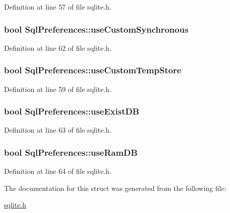 \-Definition at line 57 of file sqlite.\-h.

\hypertarget{structSqlPreferences_a3d18d11573e0546e8fe854b7584adab7}{
\subsubsection[{use\-Custom\-Synchronous}]{\setlength{\rightskip}{0pt plus 5cm}bool {\bf \-Sql\-Preferences\-::use\-Custom\-Synchronous}}}\label{structSqlPreferences_a3d18d11573e0546e8fe854b7584adab7}


\-Definition at line 62 of file sqlite.\-h.

\hypertarget{structSqlPreferences_abcd9f162cf432b71159c7c83adb8ac88}{
\subsubsection[{use\-Custom\-Temp\-Store}]{\setlength{\rightskip}{0pt plus 5cm}bool {\bf \-Sql\-Preferences\-::use\-Custom\-Temp\-Store}}}\label{structSqlPreferences_abcd9f162cf432b71159c7c83adb8ac88}


\-Definition at line 59 of file sqlite.\-h.

\hypertarget{structSqlPreferences_ae8bb4bc0c82e4f32c51efdbf3d3e1af5}{
\subsubsection[{use\-Exist\-D\-B}]{\setlength{\rightskip}{0pt plus 5cm}bool {\bf \-Sql\-Preferences\-::use\-Exist\-D\-B}}}\label{structSqlPreferences_ae8bb4bc0c82e4f32c51efdbf3d3e1af5}


\-Definition at line 63 of file sqlite.\-h.

\hypertarget{structSqlPreferences_ad7d06ce81f298cf13b7522e48d640a78}{
\subsubsection[{use\-Ram\-D\-B}]{\setlength{\rightskip}{0pt plus 5cm}bool {\bf \-Sql\-Preferences\-::use\-Ram\-D\-B}}}\label{structSqlPreferences_ad7d06ce81f298cf13b7522e48d640a78}


\-Definition at line 64 of file sqlite.\-h.



\-The documentation for this struct was generated from the following file\-:\begin{DoxyCompactItemize}
\item 
\hyperlink{sqlite_8h}{sqlite.\-h}\end{DoxyCompactItemize}
